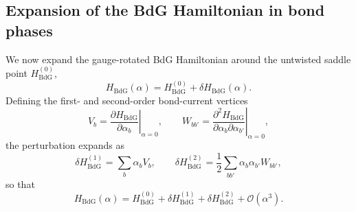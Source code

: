 \documentclass[aps,prb,twocolumn,superscriptaddress,floatfix]{revtex4-2}
\begin{document}
\subsection{Expansion of the BdG Hamiltonian in bond phases}

We now expand the gauge-rotated BdG Hamiltonian around the untwisted saddle point $H_{\mathrm{BdG}}^{(0)}$,
\begin{equation}
H_{\mathrm{BdG}}(\alpha) = H_{\mathrm{BdG}}^{(0)} + \delta H_{\mathrm{BdG}}(\alpha).
\label{eq:A22}
\end{equation}
Defining the first- and second-order bond-current vertices
\begin{equation}
V_b = \left.\frac{\partial H_{\mathrm{BdG}}}{\partial \alpha_b}\right|_{\alpha=0}, \qquad W_{bb'} = \left.\frac{\partial^2 H_{\mathrm{BdG}}}{\partial \alpha_b \partial \alpha_{b'}}\right|_{\alpha=0},
\label{eq:A23}
\end{equation}
the perturbation expands as
\begin{equation}
\delta H_{\mathrm{BdG}}^{(1)} = \sum_b \alpha_b V_b, \qquad \delta H_{\mathrm{BdG}}^{(2)} = \frac{1}{2}\sum_{bb'} \alpha_b \alpha_{b'} W_{bb'},
\label{eq:A24}
\end{equation}
so that
\begin{equation}
H_{\mathrm{BdG}}(\alpha) = H_{\mathrm{BdG}}^{(0)} + \delta H_{\mathrm{BdG}}^{(1)} + \delta H_{\mathrm{BdG}}^{(2)} + \mathcal{O}(\alpha^3).
\label{eq:A25}
\end{equation}
\end{document}

